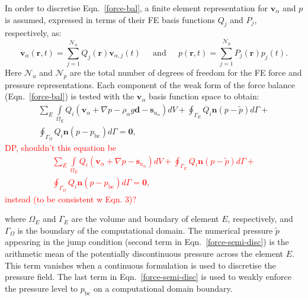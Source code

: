 \documentclass[times]{fldauth}
\newcommand{\red}{\textcolor{red}}
\begin{document}
In order to discretise Eqn.~\ref{force-bal}, a finite element
representation for $\mathbf{v}_\alpha$ and $p$ is assumed, expressed
in terms of their FE basis functions $Q_{j}$ and $P_{j}$,
respectively, as:
\begin{equation}
  \mathbf{v}_\alpha(\bm{r},t) = \sum\limits_{j=1}^{\mathcal{N}_u}
  Q_{j}(\bm{r})\mathbf{v}_{\alpha,j}(t) \;\;\;\;\text{ and } \;\;\;\;
  p(\bm{r},t) = \sum\limits_{j=1}^{\mathcal{N}_p}
  P_{j}(\bm{r})p_{j}(t).
\end{equation} 
Here $\mathcal{N}_{u}$ and $\mathcal{N}_{p}$ are the total number of
degrees of freedom for the FE force and pressure representations. Each
component of the weak form of the force balance (Eqn.~\ref{force-bal})
is tested with the $\mathbf{v}_\alpha$ basis function space to obtain:
\begin{eqnarray}
  \sum\limits_{E} \left. \int\limits_{\Omega_E} { {Q}}_i \left (
             {\mathbf v}_\alpha + \nabla p  -\rho_\alpha g \mathbf{d} -{\mathbf s}_{u_\alpha}
             \right) dV \right. + \displaystyle \oint_{\Gamma_{E}}
                   {Q}_i {\mathbf n} \left(p - \tilde{p}\right)
                   d\Gamma + \nonumber \\ \oint_{\Gamma_{\Omega}} {
                     Q}_i {\mathbf n} \left(p - p_\text{bc}\right) d\Gamma
                   = \bm{0},
                   \label{force-semi-disc} 
\end{eqnarray} 
\red{DP, shouldn't this equation be 
\begin{eqnarray}
  \sum\limits_{E} \left. \int\limits_{\Omega_E} { {Q}}_i \left (
             {\mathbf v}_\alpha + \nabla p  -{\mathbf s}_{u_\alpha}
             \right) dV \right. + \displaystyle \oint_{\Gamma_{E}}
                   {Q}_i {\mathbf n} \left(p - \tilde{p}\right)
                   d\Gamma + \nonumber \\ \oint_{\Gamma_{\Omega}} {
                     Q}_i {\mathbf n} \left(p - p_\text{bc}\right) d\Gamma
                   = \bm{0},\nonumber
                   \label{force-semi-disc} 
\end{eqnarray} 
instead (to be consistent w Eqn. 3)? }

where $\Omega_E$ and $\Gamma_{E}$ are the volume and boundary of
element $E$, respectively, and $\Gamma_{\Omega}$ is the boundary of
the computational domain. The numerical pressure $\tilde{p}$ appearing
in the jump condition (second term in Eqn.~\ref{force-semi-disc}) is
the arithmetic mean of the potentially discontinuous pressure across
the element $E$. This term vanishes when a continuous formulation is
used to discretise the pressure field. The last term in
Eqn.~\ref{force-semi-disc} is used to weakly enforce the pressure
level to $p_\text{bc}$ on a computational domain boundary.
\end{document}
